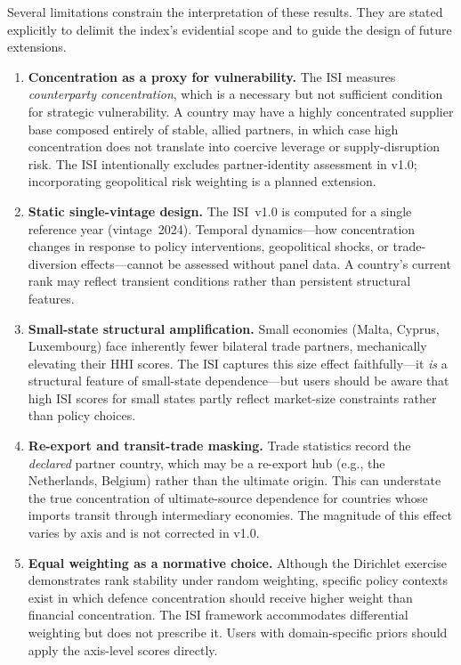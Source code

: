 Several limitations constrain the interpretation of these results.
They are stated explicitly to delimit the index's evidential scope
and to guide the design of future extensions.

\begin{enumerate}[leftmargin=2em]
  \item \textbf{Concentration as a proxy for vulnerability.}
    The ISI measures \emph{counterparty concentration}, which is
    a necessary but not sufficient condition for strategic
    vulnerability.  A country may have a highly concentrated
    supplier base composed entirely of stable, allied partners,
    in which case high concentration does not translate into
    coercive leverage or supply-disruption risk.  The ISI
    intentionally excludes partner-identity assessment in v1.0;
    incorporating geopolitical risk weighting is a planned
    extension.

  \item \textbf{Static single-vintage design.}
    The ISI~v1.0 is computed for a single reference year
    (vintage~2024).  Temporal dynamics---how concentration changes
    in response to policy interventions, geopolitical shocks, or
    trade-diversion effects---cannot be assessed without panel
    data.  A country's current rank may reflect transient
    conditions rather than persistent structural features.

  \item \textbf{Small-state structural amplification.}
    Small economies (Malta, Cyprus, Luxembourg) face inherently
    fewer bilateral trade partners, mechanically elevating their
    HHI scores.  The ISI captures this size effect faithfully---it
    \emph{is} a structural feature of small-state dependence---but
    users should be aware that high ISI scores for small states
    partly reflect market-size constraints rather than policy
    choices.

  \item \textbf{Re-export and transit-trade masking.}
    Trade statistics record the \emph{declared} partner country,
    which may be a re-export hub (e.g., the Netherlands, Belgium)
    rather than the ultimate origin.  This can understate the true
    concentration of ultimate-source dependence for countries whose
    imports transit through intermediary economies.  The magnitude
    of this effect varies by axis and is not corrected in v1.0.

  \item \textbf{Equal weighting as a normative choice.}
    Although the Dirichlet exercise demonstrates rank stability
    under random weighting, specific policy contexts exist in
    which defence concentration should receive higher weight than
    financial concentration.  The ISI framework accommodates
    differential weighting but does not prescribe it.  Users
    with domain-specific priors should apply the axis-level
    scores directly.


\end{enumerate}
